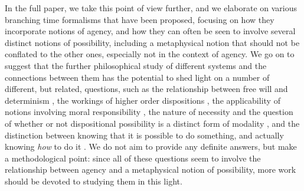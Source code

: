 \documentclass{article}
\begin{document}
In the full paper, we take this point of view further, and we elaborate on various branching time formalisms that have been proposed, focusing on how they incorporate notions of agency, and how they can often be seen to involve several distinct notions of possibility, including a metaphysical notion that should not be conflated to the other ones, especially not in the context of agency. We go on to suggest that the further philosophical study of different systems and the connections between them has the potential to shed light on a number of different, but related, questions, such as the relationship between free will and determinism \cite{Listfree,strawsonfree}, the workings of higher order dispositions \cite{dispmod}, the applicability of notions involving moral responsibility \cite{frankfurt,mensrea}, the nature of necessity and the question of whether or not dispositional possibility is a distinct form of modality \cite{DM,EaM,Los}, and the distinction between knowing that it is possible to do something, and actually knowing \emph{how} to do it \cite{atlhow,atlhowto}. We do not aim to provide any definite answers, but make a methodological point: since all of these questions seem to involve the relationship between agency and a metaphysical notion of possibility, more work should be devoted to studying them in this light.



\end{document}

